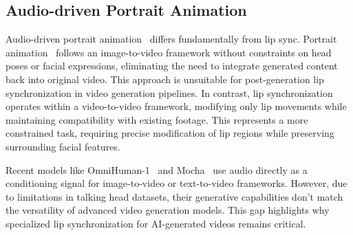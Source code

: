 \subsection{Audio-driven Portrait Animation}
Audio-driven portrait animation~\cite{tian2024emo,xu2024hallo,jiang2024loopy,chen2025echomimic,ji2024sonic} differs fundamentally from lip sync. Portrait animation~\cite{wei2024aniportrait,cui2024hallo2} follows an image-to-video framework without constraints on head poses or facial expressions, eliminating the need to integrate generated content back into original video. This approach is unsuitable for post-generation lip synchronization in video generation pipelines.
In contrast, lip synchronization~\cite{prajwal2020lip,li2024latentsync} operates within a video-to-video framework, modifying only lip movements while maintaining compatibility with existing footage. This represents a more constrained task, requiring precise modification of lip regions while preserving surrounding facial features.

Recent models like OmniHuman-1~\cite{lin2025omnihuman} and Mocha~\cite{wei2025mocha} use audio directly as a conditioning signal for image-to-video or text-to-video frameworks. However, due to limitations in talking head datasets, their generative capabilities don't match the versatility of advanced video generation models. This gap highlights why specialized lip synchronization for AI-generated videos remains critical.
